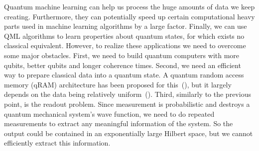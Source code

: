 \documentclass[a4paper,10pt]{article}
\begin{document}
Quantum machine learning can help us process the huge amounts of data we keep creating.
Furthermore, they can potentially speed up certain computational heavy parts used in machine learning algorithms by a large factor.
Finally, we can use QML algorithms to learn properties about quantum states, for which exists no classical equivalent.
However, to realize these applications we need to overcome some major obstacles.
First, we need to build quantum computers with more qubits, better qubits and longer coherence times.
Second, we need an efficient way to prepare classical data into a quantum state.
A quantum random access memory (qRAM) architecture has been proposed for this~(\cite{qram}), but it largely depends on the data being relatively uniform~(\cite{aaronson2015read}).
Third, similarly to the previous point, is the readout problem.
Since measurement is probabilistic and destroys a quantum mechanical system's wave function, we need to do repeated measurements to extract any meaningful information of the system.
So the output could be contained in an exponentially large Hilbert space, but we cannot efficiently extract this information.
\end{document}

